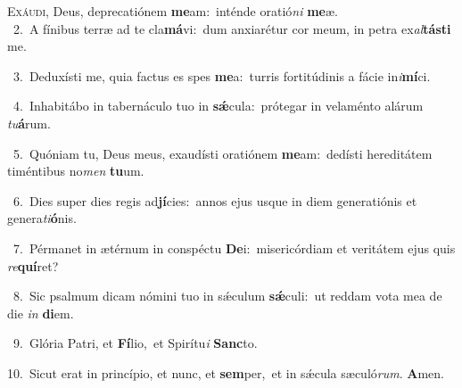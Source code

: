\lettrine{\initial\textcolor{\initialcolor}{E}}{xáudi,} Deus, deprecatiónem \textbf{me}\-am:~\star inténde oratió\textit{ni} \textbf{me}\-æ.\\
{\numbfont\textcolor{\numbcolor}{~2.}}~A fínibus terræ ad te cla\-\textbf{má}\-vi:~\star dum anxiarétur cor meum, in petra ex\-\textit{al}\-\textbf{tás}\textbf{ti} me.\par
{\numbfont\textcolor{\numbcolor}{~3.}}~Deduxísti me, quia factus es spes \textbf{me}\-a:~\star turris fortitúdinis a fácie in\-\textit{i}\-\textbf{mí}ci.\par
{\numbfont\textcolor{\numbcolor}{~4.}}~Inhabitábo in tabernáculo tuo in \textbf{sǽ}\-cula:~\star prótegar in velaménto alárum \textit{tu}\-\textbf{á}rum.\par
{\numbfont\textcolor{\numbcolor}{~5.}}~Quóniam tu, Deus meus, exaudísti oratiónem \textbf{me}\-am:~\star dedísti hereditátem timéntibus no\textit{men} \textbf{tu}\-um.\par
{\numbfont\textcolor{\numbcolor}{~6.}}~Dies super dies regis ad\-\textbf{jí}\-cies:~\star annos ejus usque in diem generatiónis et genera\-\textit{ti}\-\textbf{ó}nis.\par
{\numbfont\textcolor{\numbcolor}{~7.}}~Pérmanet in ætérnum in conspéctu \textbf{De}\-i:~\star misericórdiam et veritátem ejus quis \textit{re}\-\textbf{quí}ret?\par
{\numbfont\textcolor{\numbcolor}{~8.}}~Sic psalmum dicam nómini tuo in sǽculum \textbf{sǽ}\-culi:~\star ut reddam vota mea de die \textit{in} \textbf{di}\-em.\par
{\numbfont\textcolor{\numbcolor}{~9.}}~Glória Patri, et \textbf{Fí}\-lio,~\star et Spirítu\textit{i} \textbf{Sanc}\-to.\par
{\numbfont\textcolor{\numbcolor}{10.}}~Sicut erat in princípio, et nunc, et \textbf{sem}\-per,~\star et in sǽcula sæculó\-\textit{rum}\-. \textbf{A}\-men.\par
